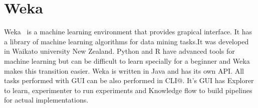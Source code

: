 \section{Weka}

Weka~\cite{hid-sp18-413-weka} is a machine learning environment that provides
grapical interface. It has a library of machine learning algorithms for data
mining tasks.It was developed in Waikato university New Zealand. Python and R
have advanced tools for machine learning but can be difficult to learn specially
for a beginner and Weka makes this transition easier. Weka is written in Java
and has its own API\@. All tasks performed with GUI can be also performed in
CLI@\@. It's GUI has Explorer to learn, experimenter to run experiments and
Knowledge flow to build pipelines for actual implementations.
